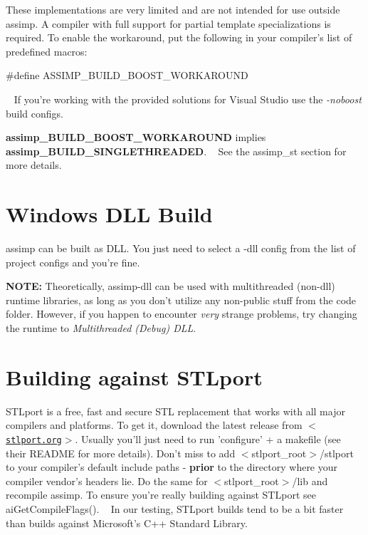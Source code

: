 These implementations are very limited and are not intended for use outside assimp. A compiler with full support for partial template specializations is required. To enable the workaround, put the following in your compiler's list of predefined macros\+: 
\begin{DoxyCode}
\textcolor{preprocessor}{#define ASSIMP\_BUILD\_BOOST\_WORKAROUND}
\end{DoxyCode}
 ~\newline
 If you're working with the provided solutions for Visual Studio use the {\itshape -\/noboost} build configs. ~\newline


{\bfseries assimp\+\_\+\+B\+U\+I\+L\+D\+\_\+\+B\+O\+O\+S\+T\+\_\+\+W\+O\+R\+K\+A\+R\+O\+U\+N\+D} implies {\bfseries assimp\+\_\+\+B\+U\+I\+L\+D\+\_\+\+S\+I\+N\+G\+L\+E\+T\+H\+R\+E\+A\+D\+E\+D}. ~\newline
 See the assimp\+\_\+st section for more details.\hypertarget{install_assimp_dll}{}\section{Windows D\+L\+L Build}\label{install_assimp_dll}
assimp can be built as D\+L\+L. You just need to select a -\/dll config from the list of project configs and you're fine.

{\bfseries N\+O\+T\+E\+:} Theoretically, assimp-\/dll can be used with multithreaded (non-\/dll) runtime libraries, as long as you don't utilize any non-\/public stuff from the code folder. However, if you happen to encounter {\itshape very} strange problems, try changing the runtime to {\itshape Multithreaded (Debug) D\+L\+L}.\hypertarget{install_assimp_stlport}{}\section{Building against S\+T\+Lport}\label{install_assimp_stlport}
S\+T\+Lport is a free, fast and secure S\+T\+L replacement that works with all major compilers and platforms. To get it, download the latest release from \href{http://www.stlport.org}{\tt $<$stlport.\+org$>$}. Usually you'll just need to run 'configure' + a makefile (see their R\+E\+A\+D\+M\+E for more details). Don't miss to add $<$stlport\+\_\+root$>$/stlport to your compiler's default include paths -\/ {\bfseries prior} to the directory where your compiler vendor's headers lie. Do the same for $<$stlport\+\_\+root$>$/lib and recompile assimp. To ensure you're really building against S\+T\+Lport see ai\+Get\+Compile\+Flags(). ~\newline
 In our testing, S\+T\+Lport builds tend to be a bit faster than builds against Microsoft's C++ Standard Library. 